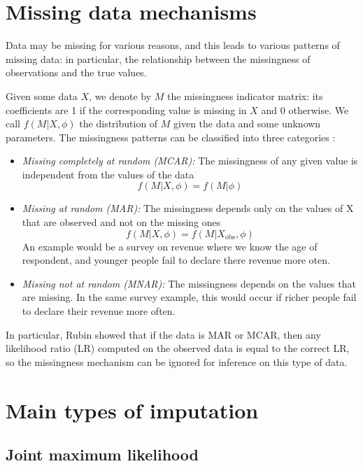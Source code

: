 	\section{Missing data mechanisms}
	Data may be missing for various reasons, and this leads to various patterns of missing data: in particular, the relationship between the missingness of observations and the true values. 
	
	Given some data $X$, we denote by $M$ the missingness indicator matrix: its coefficients are 1 if the corresponding value is missing in $X$ and 0 otherwise. We call $f(M \vert X, \phi)$ the distribution of $M$ given the data and some unknown parameters. The missingness patterns can be classified into three categories \cite[Ch.\ 1]{Rubin_missdata}:
	
\begin{itemize}
	\item \emph{Missing completely at random (MCAR):} The missingness of any given value is independent from the values of the data
	$$ f(M \vert X, \phi) = f(M \vert \phi)$$
	\item \emph{Missing at random (MAR):} The missingness depends only on the values of X that are observed and not on the missing ones
	$$f(M \vert X, \phi) = f(M \vert X_{\text{obs}}, \phi)$$
	An example would be a survey on revenue where we know the age of respondent, and younger people fail to declare there revenue more oten.
	\item \emph{Missing not at random (MNAR):} The missingness depends on the values that are missing. In the same survey example, this would occur if richer people fail to declare their revenue more often.
\end{itemize}

In particular, Rubin showed \cite{rubin1976ignorable} that if the data is MAR or MCAR, then any likelihood ratio (LR) computed on the observed data is equal to the correct LR, so the missingness mechanism can be ignored for inference on this type of data.

	\section{Main types of imputation}
		\subsection{Joint maximum likelihood}
